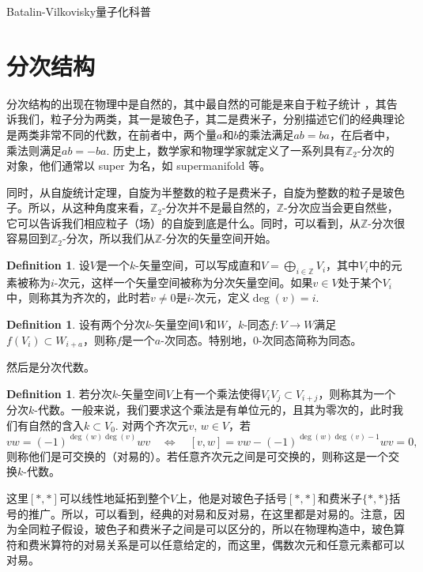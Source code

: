 \documentclass[12pt]{article}
\theoremstyle{definition}
\newtheorem{defi}[para]{Definition}
\theoremstyle{plain}
\begin{document}
Batalin-Vilkovisky量子化科普

\section{分次结构}

分次结构的出现在物理中是自然的，其中最自然的可能是来自于粒子统计%
，其告诉我们，粒子分为两类，其一是玻色子，其二是费米子，分别描述它们的经典理论是两类非常不同的代数，在前者中，两个量$a$和$b$的乘法满足$ab=ba$，在后者中，乘法则满足$ab=-ba$. 历史上，数学家和物理学家就定义了一系列具有$\mathbb{Z}_2$-分次的对象，他们通常以 super 为名，如 supermanifold 等。

同时，从自旋统计定理，自旋为半整数的粒子是费米子，自旋为整数的粒子是玻色子。所以，从这种角度来看，$\mathbb{Z}_2$-分次并不是最自然的，$\mathbb{Z}$-分次应当会更自然些，它可以告诉我们相应粒子（场）的自旋到底是什么。同时，可以看到，从$\mathbb Z$-分次很容易回到$\mathbb Z_2$-分次，所以我们从$\mathbb{Z}$-分次的矢量空间开始。

\begin{defi}
    设$V$是一个$k$-矢量空间，可以写成直和$V=\bigoplus_{i\in\mathbb Z} V_i$，其中$V_i$中的元素被称为$i$-次元，这样一个矢量空间被称为分次矢量空间。如果$v\in V$处于某个$V_i$中，则称其为齐次的，此时若$v\neq 0$是$i$-次元，定义$\deg(v)=i$. 
\end{defi}

\begin{defi}
    设有两个分次$k$-矢量空间$V$和$W$，$k$-同态$f:V\to W$满足$f(V_i)\subset W_{i+a}$，则称$f$是一个$a$-次同态。特别地，$0$-次同态简称为同态。
\end{defi}

然后是分次代数。

\begin{defi}
    若分次$k$-矢量空间$V$上有一个乘法使得$V_iV_j\subset V_{i+j}$，则称其为一个分次$k$-代数。一般来说，我们要求这个乘法是有单位元的，且其为零次的，此时我们有自然的含入$k\subset V_0$. 对两个齐次元$v$, $w\in V$，若
\[
    vw=(-1)^{\deg(w)\deg(v)}wv\quad \Leftrightarrow \quad 
    [v,w]=vw-(-1)^{\deg(w)\deg(v)-1}wv=0,
\]
则称他们是可交换的（对易的）。若任意齐次元之间是可交换的，则称这是一个交换$k$-代数。
\end{defi}

这里$[*,*]$可以线性地延拓到整个$V$上，他是对玻色子括号$[*,*]$和费米子$\{*,*\}$括号的推广。所以，可以看到，经典的对易和反对易，在这里都是对易的。注意，因为全同粒子假设，玻色子和费米子之间是可以区分的，所以在物理构造中，玻色算符和费米算符的对易关系是可以任意给定的，而这里，偶数次元和任意元素都可以对易。
\end{document}
